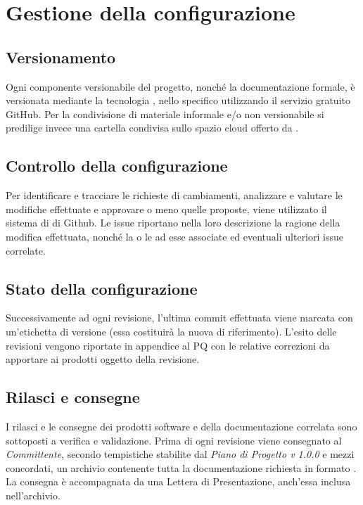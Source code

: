\documentclass[../NormediProgetto.tex]{subfiles}
\begin{document}
\section{Gestione della configurazione}

\subsection{Versionamento} 
Ogni componente versionabile del progetto, nonché la documentazione formale, è versionata mediante la tecnologia , nello specifico utilizzando il servizio gratuito GitHub.
Per la condivisione di materiale informale e/o non versionabile si predilige invece una cartella condivisa sullo spazio cloud offerto da .

\subsection{Controllo della configurazione}

Per identificare e tracciare le richieste di cambiamenti, analizzare e valutare le modifiche effettuate e approvare o meno quelle proposte, viene utilizzato il sistema di  di Github. Le issue riportano nella loro descrizione la ragione della modifica effettuata, nonché la o le  ad esse associate ed eventuali ulteriori issue correlate. 

\subsection{Stato della configurazione}

Successivamente ad ogni revisione, l'ultima commit effettuata viene marcata con un'etichetta di versione (essa costituirà la nuova  di riferimento). L'esito delle revisioni vengono riportate in appendice al PQ con le relative correzioni da apportare ai prodotti oggetto della revisione.

\subsection{Rilasci e consegne}

I rilasci e le consegne dei prodotti software e della documentazione correlata sono sottoposti a verifica e validazione. Prima di ogni revisione viene consegnato al \textit{Committente}, secondo tempistiche stabilite dal \textit{Piano di Progetto v 1.0.0} e mezzi concordati, un archivio contenente tutta la documentazione richiesta in formato . La consegna è accompagnata da una Lettera di
Presentazione, anch'essa inclusa nell'archivio.
\end{document}
